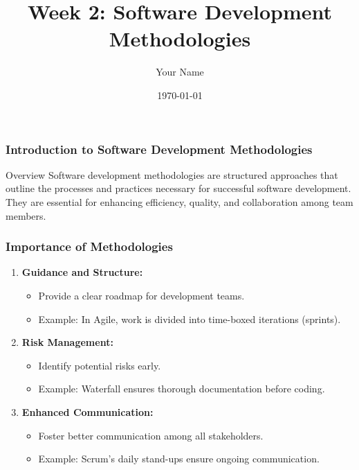 \documentclass{beamer}
\title{Week 2: Software Development Methodologies}
\author{Your Name}
\institute{Your Institution}
\date{\today}
\begin{document}
\frame{\titlepage}

\begin{frame}[fragile]
    \frametitle{Introduction to Software Development Methodologies}
    \begin{block}{Overview}
        Software development methodologies are structured approaches that outline the processes and practices necessary for successful software development. They are essential for enhancing efficiency, quality, and collaboration among team members.
    \end{block}
\end{frame}

\begin{frame}[fragile]
    \frametitle{Importance of Methodologies}
    \begin{enumerate}
        \item \textbf{Guidance and Structure:}
        \begin{itemize}
            \item Provide a clear roadmap for development teams.
            \item Example: In Agile, work is divided into time-boxed iterations (sprints).
        \end{itemize}
        
        \item \textbf{Risk Management:}
        \begin{itemize}
            \item Identify potential risks early.
            \item Example: Waterfall ensures thorough documentation before coding.
        \end{itemize}

        \item \textbf{Enhanced Communication:}
        \begin{itemize}
            \item Foster better communication among all stakeholders.
            \item Example: Scrum's daily stand-ups ensure ongoing communication.
        \end{itemize}
    \end{enumerate}
\end{frame}
\end{document}
